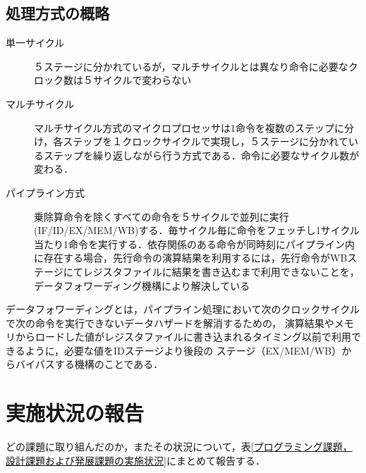\documentclass{jarticle}[11pt]
\begin{document}
\subsection{処理方式の概略}

\begin{description}
  \item [単一サイクル] ５ステージに分かれているが，マルチサイクルとは異なり命令に必要なクロック数は５サイクルで変わらない
  \item [マルチサイクル] マルチサイクル方式のマイクロプロセッサは1命令を複数のステップに分け，各ステップを１クロックサイクルで実現し，５ステージに分かれているステップを繰り返しながら行う方式である．命令に必要なサイクル数が変わる．
  \item [パイプライン方式] 乗除算命令を除くすべての命令を５サイクルで並列に実行(IF/ID/EX/MEM/WB)する．毎サイクル毎に命令をフェッチし1サイクル当たり1命令を実行する．依存関係のある命令が同時刻にパイプライン内に存在する場合，先行命令の演算結果を利用するには，先行命令がWBステージにてレジスタファイルに結果を書き込むまで利用できないことを，データフォワーディング機構により解決している
\end{description}

データフォワーディングとは，パイプライン処理において次のクロックサイクルで次の命令を実行できないデータハザードを解消するための，
演算結果やメモリからロードした値がレジスタファイルに書き込まれるタイミング以前で利用できるように，必要な値をIDステージより後段の
ステージ（EX/MEM/WB）からバイパスする機構のことである．

\section{実施状況の報告}\label{sec:実施状況の報告}

どの課題に取り組んだのか，またその状況について，表\ref{プログラミング課題，設計課題および発展課題の実施状況}にまとめて報告する．
\end{document}
